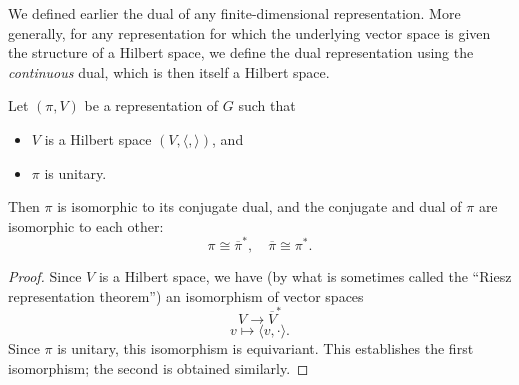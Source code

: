 \documentclass[reqno]{amsart} 
\begin{document}
We defined earlier the dual of any finite-dimensional representation.  More generally, for any representation for which the underlying vector space is given the structure of a Hilbert space, we define the dual representation using the \emph{continuous} dual, which is then itself a Hilbert space.
\begin{lemma}\label{lem:unitary-implies-conjugate-self-dual}
  Let $(\pi,V)$ be a representation of $G$ such that
  \begin{itemize}
  \item $V$ is a Hilbert space $(V, \langle , \rangle)$, and
  \item $\pi$ is unitary.
  \end{itemize}
  Then $\pi$ is isomorphic to its conjugate dual, and the conjugate and dual of $\pi$ are isomorphic to each other:
  \begin{equation*}
    \pi \cong \overline{\pi }^*, \quad \overline{\pi } \cong \pi^*.
  \end{equation*}
\end{lemma}
\begin{proof}
  Since $V$ is a Hilbert space, we have (by what is sometimes called the ``Riesz representation theorem'') an isomorphism of vector spaces
  \begin{equation*}
    V \rightarrow \overline{V}^*
  \end{equation*}
  \begin{equation*}
    v \mapsto \langle v, \cdot \rangle.
  \end{equation*}
  Since $\pi$ is unitary, this isomorphism is equivariant.  This establishes the first isomorphism; the second is obtained similarly.
\end{proof}
\end{document}
